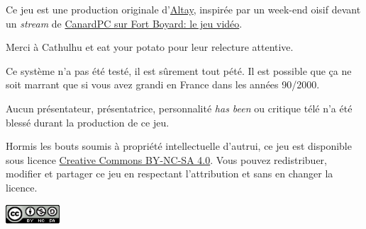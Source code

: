 \documentclass[french,twocolumn,twoside]{article}
\begin{document}
{Ce jeu est une production originale d'\href{https://altay.fr}{Altay}, inspirée par un week-end oisif devant un \textit{stream} de \href{https://www.twitch.tv/videos/448511078}{CanardPC sur Fort Boyard: le jeu vidéo}.

Merci à Cathulhu et eat your potato pour leur relecture attentive.

Ce système n'a pas été testé, il est sûrement tout pété. Il est possible que ça ne soit marrant que si vous avez grandi en France dans les années 90/2000.

Aucun présentateur, présentatrice, personnalité \textit{has been} ou critique télé n'a été blessé durant la production de ce jeu.

Hormis les bouts soumis à propriété intellectuelle d'autrui, ce jeu est disponible sous licence \href{https://creativecommons.org/licenses/by-nc-sa/4.0/}{Creative Commons BY-NC-SA 4.0}. Vous pouvez redistribuer, modifier et partager ce jeu en respectant l'attribution et sans en changer la licence.

\begin{center}
\includegraphics[width=0.15\textwidth]{licence}
\end{center}
}
\end{document}
